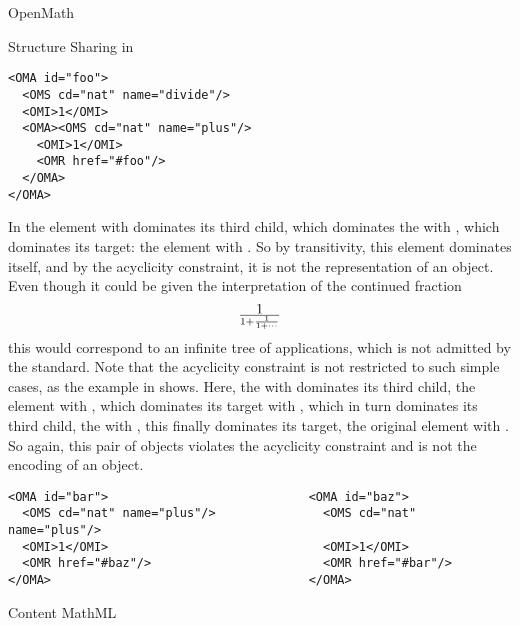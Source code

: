 \begin{omgroup}[id=mobj,short=Mathematical Objects]
\begin{omgroup}[id=openmath]{OpenMath}
\begin{module}[id=OpenMath]
\begin{omgroup}[id=om.structure-sharing]{Structure Sharing in {\openmath}}
\begin{lstlisting}[language=OpenMath,numbers=none,label=lst:chained-fraction,
  caption={A Simple Cycle},
  index={OMR,OMA}]
<OMA id="foo">
  <OMS cd="nat" name="divide"/>
  <OMI>1</OMI>
  <OMA><OMS cd="nat" name="plus"/>
    <OMI>1</OMI>
    <OMR href="#foo"/>
  </OMA> 
</OMA>
\end{lstlisting}
In {} the {} element with {}
dominates its third child, which dominates the {} with
{}, which dominates its target: the {} element
with {}. So by transitivity, this element dominates itself, and by
the acyclicity constraint, it is not the {\xml} representation of an {\openmath}
object.  Even though it could be given the interpretation of the continued
fraction
\[1\over{1 + {1\over {1+\cdots}}}\] this would correspond to an infinite tree of
applications, which is not admitted by the {\openmath} standard. Note that the acyclicity
constraint is not restricted to such simple cases, as the example in {}
shows.  Here, the {} with {} dominates its
third child, the {} element with {}, which
dominates its target {} with {}, which in
turn dominates its third child, the {} with
{}, this finally dominates its target, the original
{} element with {}. So again, this pair of
{\openmath} objects violates the acyclicity constraint and is not the {\xml} encoding of
an {\openmath} object.
\begin{lstlisting}[language=OpenMath,numbers=none,label=lst:2cycle,
  caption={A Cycle of Order Two},index={OMA,OMR}]
<OMA id="bar">                            <OMA id="baz">
  <OMS cd="nat" name="plus"/>               <OMS cd="nat" name="plus"/>
  <OMI>1</OMI>                              <OMI>1</OMI>
  <OMR href="#baz"/>                        <OMR href="#bar"/>
</OMA>                                    </OMA>
\end{lstlisting}
\end{omgroup}
\end{module}
\end{omgroup}

\begin{omgroup}[id=cmml]{Content MathML}
\begin{module}[id=cMathML]


\end{module}
\end{omgroup}
\end{omgroup}

